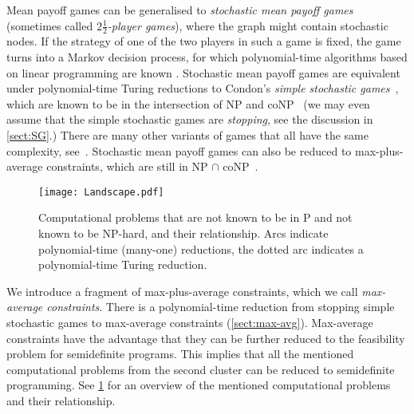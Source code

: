 \documentclass[11pt]{article}
\theoremstyle{definition}
\theoremstyle{remark}
\begin{document}
Mean payoff games can be generalised to \emph{stochastic mean payoff games} (sometimes called \emph{$2 \frac{1}{2}$-player games}), where the graph might contain stochastic nodes. If the strategy of one of the two players in such a game is fixed, the game turns into a Markov decision process, for which polynomial-time algorithms based on linear programming are known \cite{puterman}. Stochastic mean payoff games 
are equivalent under polynomial-time Turing reductions to Condon's \emph{simple stochastic games}~\cite{andersson_miltersen}, which are known to be in the intersection of NP and coNP~\cite{condon} (we may even assume that the simple stochastic games are \emph{stopping}, see the discussion in \cref{sect:SG}.) There are many other variants of games that all have the same complexity, see~\cite{andersson_miltersen}. 
Stochastic mean payoff games can also be reduced to max-plus-average constraints, 
which are still in NP $\cap$ coNP~\cite{BodirskyMaminoTropical}. 



\begin{figure}
\begin{center}
\texttt{[image: Landscape.pdf]}
    \end{center}
    \caption{Computational problems that are not known to be in P and not known to be NP-hard, and their relationship. Arcs indicate polynomial-time (many-one) reductions, the dotted arc indicates a polynomial-time Turing reduction.}
    \label{fig:landscape} 
\end{figure}

We introduce a fragment of max-plus-average constraints, which we call \emph{max-average constraints}. There is a polynomial-time reduction from stopping simple stochastic games to max-average constraints (\cref{sect:max-avg}). Max-average constraints have the advantage that they can be further reduced to the 
feasibility problem for semidefinite programs. This implies that all the mentioned computational problems from the second cluster can be reduced to semidefinite programming. 
See \cref{fig:landscape} for an overview of the mentioned computational problems and their relationship.
\end{document}
